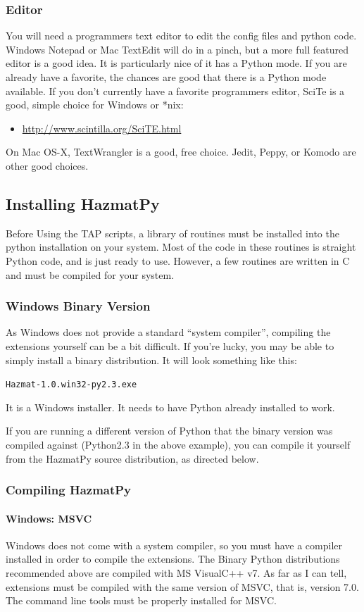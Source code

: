 \documentclass[12pt]{article}      %
\newcommand{\tap}{\textsf{TAP}\xspace}
\newcommand{\fileline}[1]{\begin{flushleft}\texttt{#1}\end{flushleft}}
\begin{document}
\subsubsection{Editor}
You will need a programmers text editor to edit the config files and
python code. Windows Notepad or Mac TextEdit will do in a pinch, but a
more full featured editor is a good idea. It is particularly nice of it
has a Python mode. If you are already have a favorite, the chances are
good that there is a Python mode available. If you don't currently have
a favorite programmers editor, SciTe is a good, simple choice for
Windows or *nix:
\begin{itemize}
\item \url{http://www.scintilla.org/SciTE.html}
\end{itemize}
On Mac OS-X, TextWrangler is a good, free choice. Jedit, Peppy, or Komodo are other good
choices. 

\subsection{Installing HazmatPy}
Before Using the \tap scripts, a library of routines must be installed
into the python installation on your system. Most of the code in these
routines is straight Python code, and is just ready to use. However, a
few routines are written in C and must be compiled for your system.

\subsubsection{Windows Binary Version}
As Windows does not provide a standard ``system compiler'', compiling the
extensions yourself can be a bit difficult. If you're lucky, you may be
able to simply install a binary distribution. It will look something
like this:
\fileline{Hazmat-1.0.win32-py2.3.exe}
It is a Windows installer. It needs to have Python already installed to
work. 

If you are running a different version of Python that the binary version
was compiled against (Python2.3 in the above example), you can compile
it yourself from the HazmatPy source distribution, as directed below.

\subsubsection{Compiling HazmatPy}
\paragraph{Windows: MSVC}
Windows does not come with a system compiler, so you must have a
compiler installed in order to compile the extensions. The Binary Python
distributions recommended above are compiled with MS VisualC++ v7.  As far as I can tell, extensions must be compiled with the same version of MSVC, that is, version 7.0. The
command line tools must be properly installed for MSVC.
\end{document}
